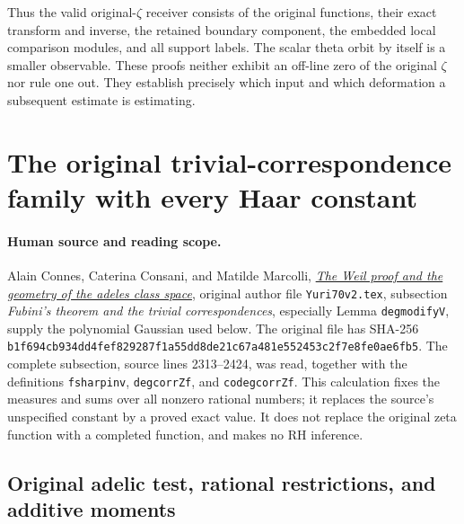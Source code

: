 \documentclass[11pt]{article}
\begin{document}
Thus the valid original-$\zeta$ receiver consists of the original
functions, their exact transform and inverse, the retained boundary
component, the embedded local comparison modules, and all support
labels. The scalar theta orbit by itself is a smaller observable.
These proofs neither exhibit an off-line zero of the original
$\zeta$ nor rule one out. They establish precisely which input and
which deformation a subsequent estimate is estimating.

\clearpage

\section{The original trivial-correspondence family with every Haar constant}
\label{sec:cc-exact-trivial-correspondence}

\paragraph{Human source and reading scope.}
Alain Connes, Caterina Consani, and Matilde Marcolli,
\href{https://arxiv.org/abs/math/0703392}{\emph{The Weil proof and the
geometry of the adeles class space}}, original author file
\texttt{Yuri70v2.tex}, subsection \emph{Fubini's theorem and the trivial
correspondences}, especially Lemma \texttt{degmodifyV}, supply the
polynomial Gaussian used below. The original file has SHA-256
\texttt{b1f694cb934dd4fe\allowbreak{}f829287f1a55dd8d\allowbreak{}e21c67a481e55245\allowbreak{}3c2f7e8fe0ae6fb5}.
The complete subsection, source lines 2313--2424, was read, together
with the definitions \texttt{fsharpinv}, \texttt{degcorrZf}, and
\texttt{codegcorrZf}. This calculation fixes the measures and sums over
all nonzero rational numbers; it replaces the source's unspecified
constant by a proved exact value. It does not replace the original
zeta function with a completed function, and makes no RH inference.

\subsection{Original adelic test, rational restrictions, and additive moments}
\end{document}
